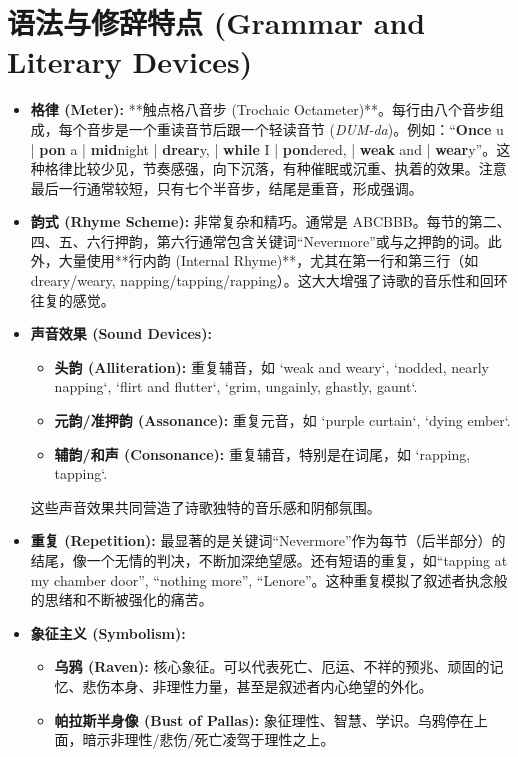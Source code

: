 \documentclass[12pt, a4paper]{article}
\begin{document}
\section{语法与修辞特点 (Grammar and Literary Devices)}

\begin{itemize}
    \item \textbf{格律 (Meter):} **触点格八音步 (Trochaic Octameter)**。每行由八个音步组成，每个音步是一个重读音节后跟一个轻读音节 (\textit{DUM-da})。例如：“\textbf{Once} u | \textbf{pon} a | \textbf{mid}night | \textbf{drear}y, | \textbf{while} I | \textbf{pon}dered, | \textbf{weak} and | \textbf{wear}y”。这种格律比较少见，节奏感强，向下沉落，有种催眠或沉重、执着的效果。注意最后一行通常较短，只有七个半音步，结尾是重音，形成强调。
    \item \textbf{韵式 (Rhyme Scheme):} 非常复杂和精巧。通常是 ABCBBB。每节的第二、四、五、六行押韵，第六行通常包含关键词“Nevermore”或与之押韵的词。此外，大量使用**行内韵 (Internal Rhyme)**，尤其在第一行和第三行（如 dreary/weary, napping/tapping/rapping）。这大大增强了诗歌的音乐性和回环往复的感觉。
    \item \textbf{声音效果 (Sound Devices):}
        \begin{itemize}
            \item \textbf{头韵 (Alliteration):} 重复辅音，如 `weak and weary`, `nodded, nearly napping`, `flirt and flutter`, `grim, ungainly, ghastly, gaunt`.
            \item \textbf{元韵/准押韵 (Assonance):} 重复元音，如 `purple curtain`, `dying ember`.
            \item \textbf{辅韵/和声 (Consonance):} 重复辅音，特别是在词尾，如 `rapping, tapping`.
        \end{itemize}
        这些声音效果共同营造了诗歌独特的音乐感和阴郁氛围。
    \item \textbf{重复 (Repetition):} 最显著的是关键词“Nevermore”作为每节（后半部分）的结尾，像一个无情的判决，不断加深绝望感。还有短语的重复，如“tapping at my chamber door”, “nothing more”, “Lenore”。这种重复模拟了叙述者执念般的思绪和不断被强化的痛苦。
    \item \textbf{象征主义 (Symbolism):}
        \begin{itemize}
            \item \textbf{乌鸦 (Raven):} 核心象征。可以代表死亡、厄运、不祥的预兆、顽固的记忆、悲伤本身、非理性力量，甚至是叙述者内心绝望的外化。
            \item \textbf{帕拉斯半身像 (Bust of Pallas):} 象征理性、智慧、学识。乌鸦停在上面，暗示非理性/悲伤/死亡凌驾于理性之上。

\end{itemize}
\end{itemize}
\end{document}
